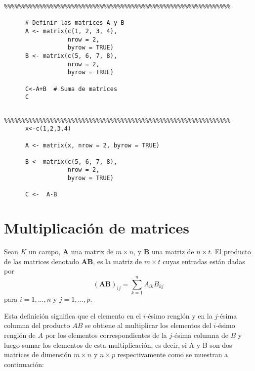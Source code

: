 \begin{}
\begin{verbatim}
%%%%%%%%%%%%%%%%%%%%%%%%%%%%%%%%%%%%%%%%%%%%%%%%%%%%%%%%%%%%%%%%    

      # Definir las matrices A y B
      A <- matrix(c(1, 2, 3, 4), 
                  nrow = 2, 
                  byrow = TRUE)
      B <- matrix(c(5, 6, 7, 8),
                  nrow = 2,
                  byrow = TRUE)

      C<-A+B  # Suma de matrices
      C
\end{verbatim}


\begin{verbatim}

%%%%%%%%%%%%%%%%%%%%%%%%%%%%%%%%%%%%%%%%%%%%%%%%%%%%%%%%%%%%%%%%
      x<-c(1,2,3,4)

      A <- matrix(x, nrow = 2, byrow = TRUE)

      B <- matrix(c(5, 6, 7, 8), 
                  nrow = 2,
                  byrow = TRUE)

      C <-  A-B
\end{verbatim}


\section{Multiplicación de matrices} 

\begin{definition}
Sean $K$ un campo, $\boldsymbol{A}$ una matriz de $m\times n$, y $\boldsymbol{B}$ una matriz
de $n\times t$. El producto de las matrices  denotado $\boldsymbol{AB}$, es la matriz de $m\times t$ cuyas entradas están dadas por\\
$$
\boldsymbol{(AB)}_{ij} = \sum_{k=1}^{n} A_{ik}B_{kj}
$$
para $i=1,...,n$ y $j=1,...,p$. 
\end{definition}


Esta definición significa que el elemento en el $i$-ésimo renglón y en la $j$-ésima columna del producto $AB$ se obtiene al multiplicar los elementos del $i$-ésimo renglón de $A$ por los elementos correspondientes de la $j$-ésima columna de $B$ y
luego sumar los elementos de esta multiplicación, es decir, si A y B son dos matrices de dimensión $m\times n$ y $n\times p$ respectivamente  como se muestran a continuación:


\end{}
